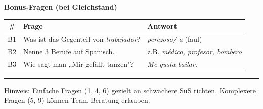\documentclass[11pt, a4paper]{article}
\begin{document}
\vspace{1cm}

\begin{center}
{\large\bfseries Bonus-Fragen (bei Gleichstand)}
\end{center}

\vspace{0.3cm}

\begin{tabularx}{\textwidth}{|c|X|X|}
\hline
\rowcolor{spanisch!10}
\textbf{\#} & \textbf{Frage} & \textbf{Antwort} \\
\hline
B1 & Was ist das Gegenteil von \textit{trabajador}? & \textit{perezoso/-a} (faul) \\
\hline
B2 & Nenne 3 Berufe auf Spanisch. & z.B. \textit{médico, profesor, bombero} \\
\hline
B3 & Wie sagt man „Mir gefällt tanzen"? & \textit{Me gusta bailar.} \\
\hline
\end{tabularx}

\vspace{1cm}

\hrule
\vspace{0.3cm}
{\small\color{grau} Hinweis: Einfache Fragen (1, 4, 6) gezielt an schwächere SuS richten. Komplexere Fragen (5, 9) können Team-Beratung erlauben.}
\end{document}
